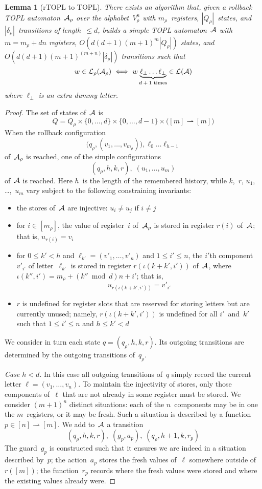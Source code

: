 \documentclass[9pt, preprint]{sigplanconf} %
\newcommand{\pmap}{\rightharpoonup}
\newtheorem{lemma}{Lemma}
\theoremstyle{definition}
\theoremstyle{remark}
\begin{document}
\begin{lemma}[rTOPL to TOPL]\label{lemma:rtopl-to-topl}
There exists an algorithm that, given a rollback TOPL automaton~${\cal A}_\rho$ over the alphabet~$V_\rho^n$ with $m_\rho$~registers, $|Q_\rho|$~states, and $|\delta_\rho|$~transitions of length~$\le d$, builds a simple TOPL automaton~${\cal A}$ with $m=m_\rho+dn$ registers, $O(d(d+1) (m+1)^m|Q_\rho|)$ states, and $O(d(d+1) (m+1)^{(m+n)}|\delta_\rho|)$ transitions such that
\[ w\in{\cal L}_\rho({\cal A}_\rho) \iff w\underbrace{\ell_\bot\ldots\ell_\bot}_{\text{$d+1$~times}}\in{\cal L}({\cal A})\]
where $\ell_\bot$ is an extra dummy letter.
\end{lemma}
\begin{proof}
The set of states of~${\cal A}$ is \[Q=Q_\rho\times\{0,\ldots,d\}\times\{0,\ldots,d-1\}\times\bigl([m]\pmap[m]\bigr)\]
When the rollback configuration
\[ \bigl(q_\rho,(v_1,\ldots,v_{m_\rho})\bigr),\ell_0\ldots\ell_{h-1}\]
of~${\cal A}_\rho$ is reached, one of the simple configurations
\[ (q_\rho,h,k,r),\;(u_1,\ldots,u_m) \]
of~${\cal A}$ is reached.
Here $h$~is the length of the remembered history, while $k$,~$r$, $u_1$, \dots,~$u_m$ vary subject to the following constraining invariants:
\begin{itemize}
\item the stores of~${\cal A}$ are injective: $u_i \ne u_j$ if $i\ne j$
\item for $i\in[m_\rho]$, the value of register~$i$ of~${\cal A}_\rho$ is stored in register $r(i)$ of~${\cal A}$; that is, $ u_{r(i)} = v_i $
\item for $0\le k'<h$ and $\ell_{k'}=(v'_1,\ldots,v'_n)$ and $1\le i'\le n$, the $i'$th component~$v'_{i'}$ of letter~$\ell_{k'}$ is stored in register $r(\iota(k+k',i'))$ of~${\cal A}$, where $\iota(k'',i')=m_\rho+(k''\bmod d)n+i'$; that is,
  \[u_{r(\iota(k+k',i'))}=v'_{i'}\]
\item $r$ is undefined for register slots that are reserved for storing letters but are currently unused; namely, $r(\iota(k+k',i'))$ is undefined for all $i'$~and~$k'$ such that $1\le i'\le n$ and $h\le k'<d$
\end{itemize}

\smallskip
We consider in turn each state $q=(q_\rho,h,k,r)$.
Its outgoing transitions are determined by the outgoing transitions of~$q_\rho$.

{\it Case $h<d$}.
In this case all outgoing transitions of~$q$ simply record the current letter $\ell=(v_1,\ldots,v_n)$.
To maintain the injectivity of stores, only those components of~$\ell$ that are not already in some register must be stored.
We consider $(m+1)^n$ distinct situations: each of the $n$~components may be in one the $m$~registers, or it may be fresh.
Such a situation is described by a function $p\in[n]\pmap[m]$.
We add to~${\cal A}$ a transition
\[ (q_\rho,h,k,r),\;(g_p,a_p),\;(q_\rho,h+1,k,r_p)\]
The guard~$g_p$ is constructed such that it ensures we are indeed in a situation described by~$p$; the action~$a_p$ stores the fresh values of~$\ell$ somewhere outside of $r([m])$; the function~$r_p$ records where the fresh values were stored and where the existing values already were.


\end{proof}
\end{document}
